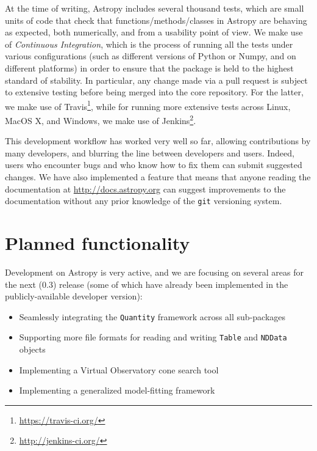 \documentclass[traditabstract]{aa}
\begin{document}
At the time of writing, Astropy includes several thousand tests, which are small units of code that check that functions/methods/classes in Astropy are behaving as expected, both numerically, and from a usability point of view. We make use of \textit{Continuous Integration}, which is the process of running all the tests under various configurations (such as different versions of Python or Numpy, and on different platforms) in order to ensure that the package is held to the highest standard of stability. In particular, any change made via a pull request is subject to extensive testing before being merged into the core repository. For the latter, we make use of Travis\footnote{\url{https://travis-ci.org/}}, while for running more extensive tests across Linux, MacOS X, and Windows, we make use of Jenkins\footnote{\url{http://jenkins-ci.org/}}.

This development workflow has worked very well so far, allowing contributions by many developers, and blurring the line between developers and users. Indeed, users who encounter bugs and who know how to fix them can submit suggested changes. We have also implemented a feature that means that anyone reading the documentation at \url{http://docs.astropy.org} can suggest improvements to the documentation without any prior knowledge of the \texttt{git} versioning system.

\section{Planned functionality}

\label{sec:future}


Development on Astropy is very active, and we are focusing on several areas for the next (0.3) release (some of which have already been implemented in the publicly-available developer version):

\begin{itemize}
\item Seamlessly integrating the \texttt{Quantity} framework across all sub-packages
\item Supporting more file formats for reading and writing \texttt{Table} and \texttt{NDData} objects
\item Implementing a Virtual Observatory cone search tool
\item Implementing a generalized model-fitting framework
\end{itemize}
\end{document}
